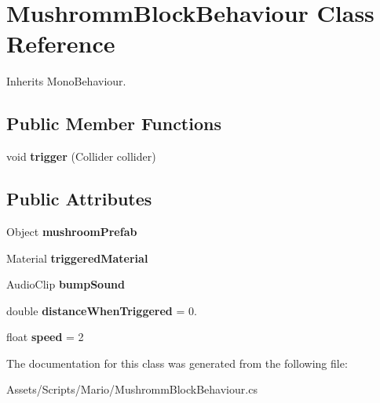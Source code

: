 \hypertarget{class_mushromm_block_behaviour}{\section{Mushromm\-Block\-Behaviour Class Reference}
\label{class_mushromm_block_behaviour}
}


Inherits Mono\-Behaviour.

\subsection*{Public Member Functions}
\begin{DoxyCompactItemize}
\item 
\hypertarget{class_mushromm_block_behaviour_ade1232e637d54fa29d719abd589e9ab8}{void {\bfseries trigger} (Collider collider)}\label{class_mushromm_block_behaviour_ade1232e637d54fa29d719abd589e9ab8}

\end{DoxyCompactItemize}
\subsection*{Public Attributes}
\begin{DoxyCompactItemize}
\item 
\hypertarget{class_mushromm_block_behaviour_a747a2f566eaada0bfb5e1608cea0fb04}{Object {\bfseries mushroom\-Prefab}}\label{class_mushromm_block_behaviour_a747a2f566eaada0bfb5e1608cea0fb04}

\item 
\hypertarget{class_mushromm_block_behaviour_ac501b361dfda5a9615635c3d93398ded}{Material {\bfseries triggered\-Material}}\label{class_mushromm_block_behaviour_ac501b361dfda5a9615635c3d93398ded}

\item 
\hypertarget{class_mushromm_block_behaviour_afe3ef0ebda32ff4e72e56187ac34d641}{Audio\-Clip {\bfseries bump\-Sound}}\label{class_mushromm_block_behaviour_afe3ef0ebda32ff4e72e56187ac34d641}

\item 
\hypertarget{class_mushromm_block_behaviour_a03ec62b43048c2d6c3f1bfb16f17856d}{double {\bfseries distance\-When\-Triggered} = 0.}\label{class_mushromm_block_behaviour_a03ec62b43048c2d6c3f1bfb16f17856d}

\item 
\hypertarget{class_mushromm_block_behaviour_a6471073de646b424f5243ea0c084b861}{float {\bfseries speed} = 2}\label{class_mushromm_block_behaviour_a6471073de646b424f5243ea0c084b861}

\end{DoxyCompactItemize}


The documentation for this class was generated from the following file\-:\begin{DoxyCompactItemize}
\item 
Assets/\-Scripts/\-Mario/Mushromm\-Block\-Behaviour.\-cs\end{DoxyCompactItemize}
